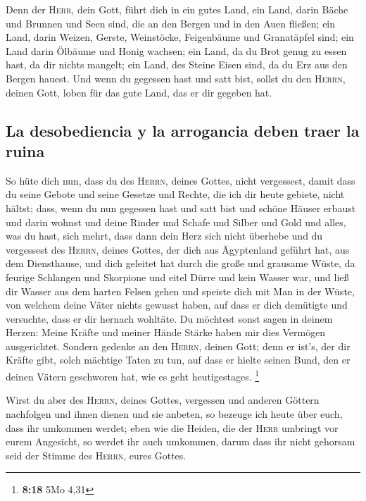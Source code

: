  Denn der \textsc{Herr}, dein Gott, führt dich in ein
gutes Land, ein Land, darin Bäche und Brunnen und Seen sind, die an den
Bergen und in den Auen fließen;  ein Land, darin Weizen,
Gerste, Weinstöcke, Feigenbäume und Granatäpfel sind; ein Land darin
Ölbäume und Honig wachsen;  ein Land, da du Brot genug zu
essen hast, da dir nichts mangelt; ein Land, des Steine Eisen sind, da
du Erz aus den Bergen hauest.  Und wenn du gegessen hast
und satt bist, sollst du den \textsc{Herrn}, deinen Gott, loben für das
gute Land, das er dir gegeben hat.

\hypertarget{la-desobediencia-y-la-arrogancia-deben-traer-la-ruina}{%
\subsection{La desobediencia y la arrogancia deben traer la
ruina}\label{la-desobediencia-y-la-arrogancia-deben-traer-la-ruina}}

 So hüte dich nun, dass du des \textsc{Herrn}, deines
Gottes, nicht vergessest, damit dass du seine Gebote und seine Gesetze
und Rechte, die ich dir heute gebiete, nicht hältst; 
dass, wenn du nun gegessen hast und satt bist und schöne Häuser erbaust
und darin wohnst  und deine Rinder und Schafe und Silber
und Gold und alles, was du hast, sich mehrt,  dass dann
dein Herz sich nicht überhebe und du vergessest des \textsc{Herrn},
deines Gottes, der dich aus Ägyptenland geführt hat, aus dem
Diensthause,  und dich geleitet hat durch die große und
grausame Wüste, da feurige Schlangen und Skorpione und eitel Dürre und
kein Wasser war, und ließ dir Wasser aus dem harten Felsen gehen
 und speiste dich mit Man in der Wüste, von welchem deine
Väter nichts gewusst haben, auf dass er dich demütigte und versuchte,
dass er dir hernach wohltäte.  Du möchtest sonst sagen in
deinem Herzen: Meine Kräfte und meiner Hände Stärke haben mir dies
Vermögen ausgerichtet.  Sondern gedenke an den
\textsc{Herrn}, deinen Gott; denn er ist's, der dir Kräfte gibt, solch
mächtige Taten zu tun, auf dass er hielte seinen Bund, den er deinen
Vätern geschworen hat, wie es geht heutigestages. \footnote{\textbf{8:18}
  5Mo 4,31}

 Wirst du aber des \textsc{Herrn}, deines Gottes,
vergessen und anderen Göttern nachfolgen und ihnen dienen und sie
anbeten, so bezeuge ich heute über euch, dass ihr umkommen werdet;
 eben wie die Heiden, die der \textsc{Herr} umbringt vor
eurem Angesicht, so werdet ihr auch umkommen, darum dass ihr nicht
gehorsam seid der Stimme des \textsc{Herrn}, eures Gottes.

